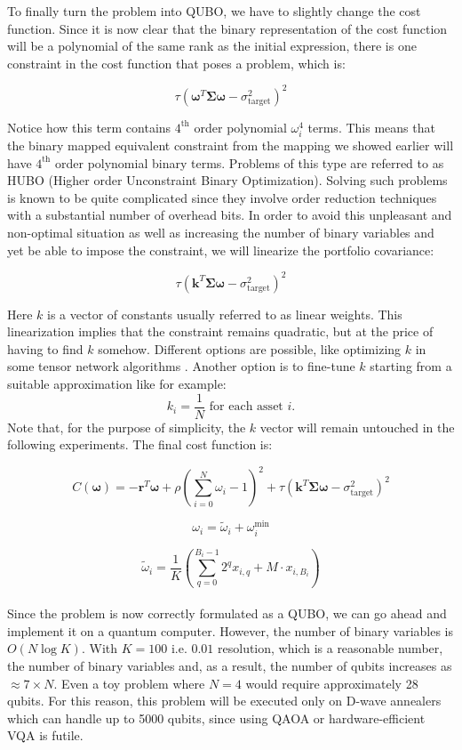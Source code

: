 \documentclass[12pt,a4paper]{report}
\begin{document}
\noindent
To finally turn the problem into QUBO, we have to slightly change the cost function. Since it is now clear that the binary representation of the cost function will be a polynomial of the same rank as the initial expression, there is one constraint in the cost function that poses a problem, which is:

\[ \tau (\boldsymbol{\omega}^T \mathbf{\Sigma} \boldsymbol{\omega} - \sigma_{\text{target}}^2)^2 \]

\noindent
Notice how this term contains \(4^{\text{th}}\) order polynomial \(\omega_i^4\) terms. This means that the binary mapped equivalent constraint from the mapping we showed earlier will have \(4^{\text{th}}\) order polynomial binary terms. Problems of this type are referred to as HUBO (Higher order Unconstraint Binary Optimization). Solving such problems is known to be quite complicated since they involve order reduction techniques with a substantial number of overhead bits. In order to avoid this unpleasant and non-optimal situation as well as increasing the number of binary variables and yet be able to impose the constraint, we will linearize the portfolio covariance:

\[ \tau (\boldsymbol{k}^T \mathbf{\Sigma} \boldsymbol{\omega} - \sigma_{\text{target}}^2)^2 \]

\noindent
Here \( k \) is a vector of constants usually referred to as linear weights. This linearization implies that the constraint remains quadratic, but at the price of having to find \( k \) somehow. Different options are possible, like optimizing \( k \) in some tensor network algorithms \cite{Tensor}. Another option is to fine-tune \( k \) starting from a suitable approximation like for example:
\[ k_i = \frac{1}{N} \text{ for each asset } i. \]
Note that, for the purpose of simplicity, the \( k \) vector will remain untouched in the following experiments. The final cost function is:

\[
C(\boldsymbol{\omega}) = -\mathbf{r}^T \boldsymbol{\omega} + \rho \left( \sum_{i=0}^{N} \omega_i - 1 \right)^2 + \tau (\boldsymbol{k}^T \mathbf{\Sigma} \boldsymbol{\omega} - \sigma_{\text{target}}^2)^2
\]

\[ \omega_i = \tilde{\omega}_i + \omega_i^{\text{min}} \]

\[
\tilde{\omega}_i = \frac{1}{K} \left( \sum_{q=0}^{B_i-1} 2^q x_{i,q} + M \cdot x_{i,B_i} \right)
\]
\\
\noindent
Since the problem is now correctly formulated as a QUBO, we can go ahead and implement it on a quantum computer. However, the number of binary variables is \(O(N \log K)\). With \(K=100\) i.e. \(0.01\) resolution, which is a reasonable number, the number of binary variables and, as a result, the number of qubits increases as \(\approx 7 \times N\). Even a toy problem where \(N=4\) would require approximately 28 qubits. For this reason, this problem will be executed only on D-wave annealers which can handle up to 5000 qubits, since using QAOA or hardware-efficient VQA is futile.
\end{document}

